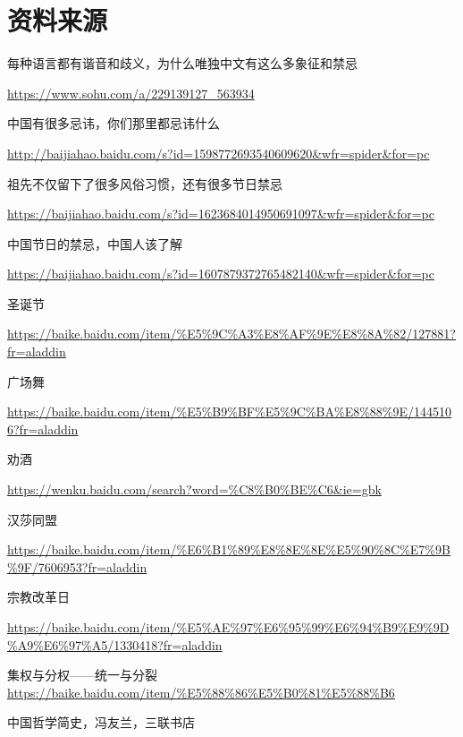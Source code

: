 \chapter{资料来源}
\setlength\parindent{0em}
\cnprolight
\par
每种语言都有谐音和歧义，为什么唯独中文有这么多象征和禁忌 

\url{https://www.sohu.com/a/229139127_563934} 

中国有很多忌讳，你们那里都忌讳什么 

\url{http://baijiahao.baidu.com/s?id=1598772693540609620&wfr=spider&for=pc }

祖先不仅留下了很多风俗习惯，还有很多节日禁忌 

\url{https://baijiahao.baidu.com/s?id=1623684014950691097&wfr=spider&for=pc} 

中国节日的禁忌，中国人该了解 

\url{https://baijiahao.baidu.com/s?id=1607879372765482140&wfr=spider&for=pc}

圣诞节

\url{https://baike.baidu.com/item/%E5%9C%A3%E8%AF%9E%E8%8A%82/127881?fr=aladdin}

广场舞

\url{https://baike.baidu.com/item/%E5%B9%BF%E5%9C%BA%E8%88%9E/1445106?fr=aladdin}

劝酒

\url{https://wenku.baidu.com/search?word=%C8%B0%BE%C6&ie=gbk}

汉莎同盟

\url{https://baike.baidu.com/item/%E6%B1%89%E8%8E%8E%E5%90%8C%E7%9B%9F/7606953?fr=aladdin}

宗教改革日

\url{https://baike.baidu.com/item/%E5%AE%97%E6%95%99%E6%94%B9%E9%9D%A9%E6%97%A5/1330418?fr=aladdin}

集权与分权——统一与分裂
\url{https://baike.baidu.com/item/%E5%88%86%E5%B0%81%E5%88%B6}

中国哲学简史，冯友兰，三联书店
